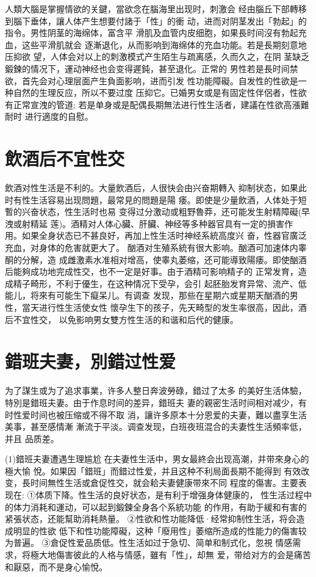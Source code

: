 \documentclass[12pt,UTF8]{ctexbook}
\begin{document}
人類大腦是掌握情欲的关鍵，當欲念在腦海里出现时，刺激会
经由腦丘下部轉移到腦下垂体，讓人体产生想要付諸于「性」的衝
动，进而对阴茎发出「勃起」的指令。男性阴茎的海绵体，富含平
滑肌及血管内皮细胞，如果長时间沒有勃起充血，这些平滑肌就会
逐漸退化，从而影响到海绵体的充血功能。若是長期刻意地压抑欲
望，人体会对以上的刺激模式产生陌生与疏离感，久而久之，在阴
茎缺乏鍛鍊的情况下，運动神经也会变得遲鈍，甚至退化。正常的
男性若是長时间禁欲，首先会对心理层面产生負面影响，进而引发
性功能障礙。自发性的性欲是一种自然的生理反应，所以不要过度
压抑它。已婚男女或是有固定性伴侶者，性欲有正常宣洩的管道;
若是单身或是配偶長期無法进行性生活者，建議在性欲高漲難耐时
进行適度的自慰。

\section{飲酒后不宜性交}

飲酒对性生活是不利的。大量飲酒后，人很快会由兴奋期轉入
抑制状态，如果此时有性生活容易出现問題，最常見的問題是陽
痿。即使是少量飲酒，人体处于短暫的兴奋状态，性生活时也易
变得过分激动或粗野魯莽，还可能发生射精障礙(早洩或射精延
莲)。酒精对人体心臟、肝臟、神经等多种器官具有一定的損害作
用。如果全身状态已不甚良好，再加上性生活时神经系統高度兴
奋，性器官廣泛充血，对身体的危害就更大了。
酗酒对生殖系統有很大影响。酗酒可加速体内睾酮的分解，造
成雌激素水准相对增高，使睾丸萎缩，还可能導致陽痿。即使酗酒
后能夠成功地完成性交，也不一定是好事。由于酒精可影响精子的
正常发育，造成精子畸形，不利于優生，在这种情况下受孕，会引
起胚胎发育异常、流产、低能儿，将來有可能生下癡呆儿。有调查
发现，那些在星期六或星期天酗酒的男性，當天进行性生活使女性
懷孕生下的孩子，先天畸型的发生率很高，因此，酒后不宜性交，
以免影响男女雙方性生活的和谐和后代的健康。

\section{錯班夫妻，別錯过性爱}

为了謀生或为了追求事業，许多人整日奔波勞碌，錯过了太多
的美好生活体驗，特別是錯班夫妻。由于作息时间的差异，錯班夫
妻的親密生活时间相对减少，有时性爱时间也被压缩或不得不取
消，讓许多原本十分恩爱的夫妻，難以盡享生活美事，甚至感情漸
漸流于平淡。调查发现，白班夜班混合的夫妻性生活頻率低，并且
品质差。

(1)錯班夫妻遭遇生理尴尬
在夫妻性生活中，男女最終会出现高潮，并带來身心的極大愉
悅。如果因「錯班」而錯过性爱，并且这种不利局面長期不能得到
有效改变，長时间無性生活或倉促性交，就会耠夫妻健康带來不同
程度的傷害。主要表现在:
①体质下降。性生活的良好状态，是有利于增强身体健康的，
性生活过程中的体力消耗和運动，可以起到鍛鍊全身各个系統功能
的作用，有助于緩和有害的紧張状态，还能幫助消耗熱量。
②性欲和性功能降低·经常抑制性生活，将会造成明显的性欲
低下和性功能障礙，这种「廢用性」萎缩所造成的性能力的傷害较
为普遍。
③倉促性爱品质低。性生活如过于急切、简单和制式化，忽視
情感需求，将極大地傷害彼此的人格与情感，雖有「性」，却無
爱，带给对方的会是痛苦和厭惡，而不是身心愉悅。
\end{document}
